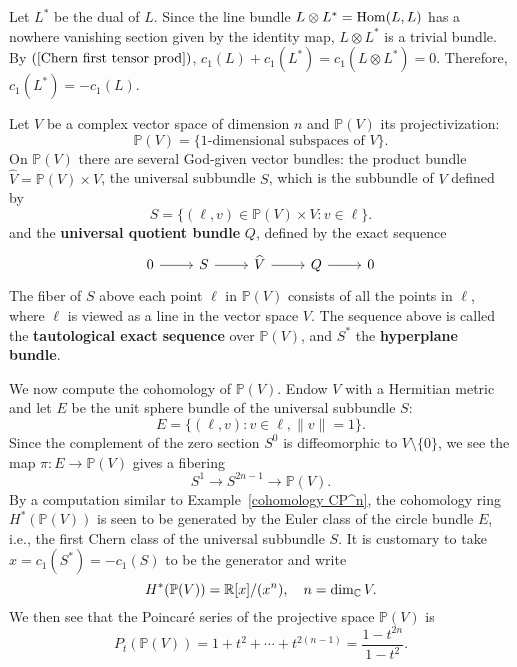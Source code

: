 Let $L^*$ be the dual of $L$. Since the line bundle $L\otimes L^*=\mathrm{Hom}(L,L)$ has a nowhere vanishing section given by the identity map, $L\otimes L^*$ is a trivial 
bundle. By $(\ref{Chern first tensor prod})$, $c_1(L)+c_1(L^*)=c_1(L\otimes L^*)=0$. Therefore, $c_1(L^*)=-c_1(L)$.
\begin{example}
Let $V$ be a complex vector space of dimension $n$ and $\mathbb{P}(V)$ its projectivization:
\[\mathbb{P}(V)=\{\text{$1$-dimensional subspaces of $V$}\}.\]
On $\mathbb{P}(V)$ there are several God-given vector bundles: the product bundle $\widehat{V}=\mathbb{P}(V)\times V$, the universal subbundle $S$, which is the 
subbundle of $V$ defined by
\[S=\{(\ell,v)\in\mathbb{P}(V)\times V:v\in\ell\}.\]
and the \textbf{universal quotient bundle} $Q$, defined by the exact sequence
\[\begin{tikzcd}
0\ar[r]&S\ar[r]&\widehat{V}\ar[r]&Q\ar[r]&0
\end{tikzcd}\]
The fiber of $S$ above each point $\ell$ in $\mathbb{P}(V)$ consists of all the points in $\ell$, where $\ell$ is viewed as a line in the vector space $V$. The sequence above 
is called the \textbf{tautological exact sequence} over $\mathbb{P}(V)$, and $S^*$ the \textbf{hyperplane bundle}.\par
We now compute the cohomology of $\mathbb{P}(V)$. Endow $V$ with a Hermitian metric and let $E$ be the unit sphere bundle of the universal subbundle $S$:
\[E=\{(\ell,v):v\in\ell,\|v\|=1\}.\]
Since the complement of the zero section $S^0$ is diffeomorphic to $V\setminus\{0\}$, we see the map $\pi:E\to\mathbb{P}(V)$ gives a fibering
\[S^1\to S^{2n-1}\to \mathbb{P}(V).\]
By a computation similar to Example~\ref{cohomology CP^n}, the cohomology ring $H^*(\mathbb{P}(V))$ is seen to be generated by the Euler class of the circle bundle $E$, i.e., the first Chern class 
of the universal subbundle $S$. It is customary to take $x=c_1(S^*)=-c_1(S)$ to be the generator and write
\[H^*(\mathbb{P}(V))=\mathbb{R}[x]/(x^n),\quad n=\dim_{\mathbb{C}} V.\]
We then see that the Poincar\'e series of the projective space $\mathbb{P}(V)$ is
\[P_t(\mathbb{P}(V))=1+t^2+\cdots+t^{2(n-1)}=\frac{1-t^{2n}}{1-t^2}.\]
\end{example}
